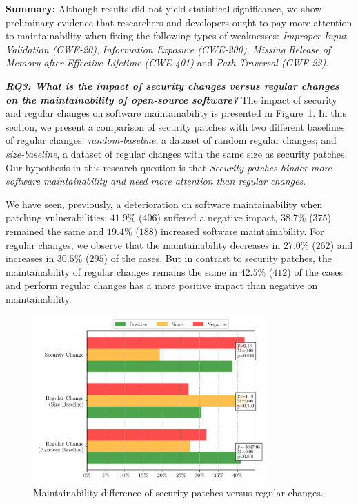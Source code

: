 \documentclass[smallextended]{svjour3}       %
\begin{document}
\textbf{Summary:}
Although results did not yield statistical significance, we show preliminary evidence that 
researchers and developers ought to pay more attention to maintainability when fixing the 
following types of weaknesses: \emph{Improper Input Validation (CWE-20)}, \emph{Information Exposure
(CWE-200)}, \emph{Missing Release of Memory after Effective
Lifetime (CWE-401)} and \emph{Path Traversal (CWE-22)}.


\textit{\textbf{RQ3: What is the impact of security changes versus regular 
changes on the maintainability of open-source software?}}
The impact of security and regular changes on software maintainability 
is presented in Figure~\ref{fig:secvsreg}. In this section, 
we present a comparison of security patches with 
two different baselines of regular changes: \emph{random-baseline},
a dataset of random regular changes;
and \emph{size-baseline}, a dataset of  
regular changes with the same size as security 
patches. Our hypothesis in this research question is
that \emph{Security patches hinder more software maintainability and 
need more attention than regular changes}.

We have seen, previously, a deterioration on software maintainability 
when patching vulnerabilities: $41.9\%$ ($406$) suffered a 
negative impact, $38.7\%$ ($375$) remained the same and $19.4\%$ 
($188$) increased software maintainability. For regular changes, 
we observe that the maintainability decreases in $27.0\%$ ($262$) 
and increases in $30.5\%$ ($295$) of the cases. But in contrast to 
security patches, the maintainability of regular changes remains the 
same in $42.5\%$ ($412$) of the cases and perform regular
changes has a more positive impact than negative on  
maintainability. 

\begin{figure}[htp]
  \centering
  \includegraphics[width=0.8\textwidth]{figures/baseline.pdf}
  \caption{Maintainability difference of security patches versus regular changes.}
  \label{fig:secvsreg}    
\end{figure}
\end{document}
